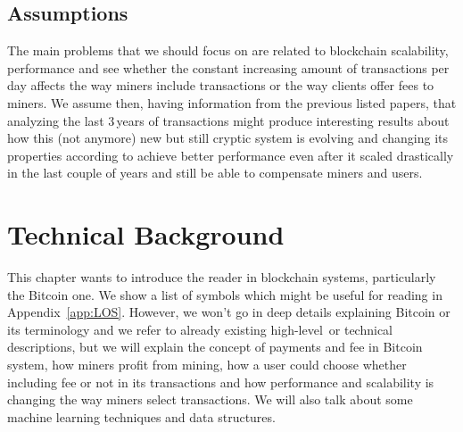 \documentclass[USenglish]{uit-thesis}
\begin{document}
\section{Assumptions} %
\label{sec:assumptions}
The main problems that we should focus on
are related to blockchain scalability, performance and
see whether the constant increasing amount of transactions
per day affects the way miners include transactions
or the way clients offer fees to miners.
We assume then, having information from the
previous listed papers, that analyzing the last $3$\,years
of transactions might produce interesting
results about how this (not anymore) new but still
cryptic system is evolving and changing its
properties according to achieve better performance
even after it scaled drastically in the last couple of
years
and still be able to compensate miners and users.

\chapter{Technical Background}
\label{chap:techback}
This chapter wants to introduce the reader in blockchain systems,
particularly the Bitcoin one. We show a list of symbols which
might be useful for reading in Appendix~\ref{app:LOS}. However,
we won't go in deep details explaining Bitcoin or its
terminology and we refer
to already existing high-level\,\cite{Bohme2015BETG} or
technical\,\cite{ethereum, bitcoinmining,
bitcoin_blockchain, Rizun:2015:blocksizelimit, Nakamoto_bitcoin,
ethereum_white_paper} descriptions, but we will explain the concept
of payments and fee in Bitcoin system, how miners profit from
mining,
how a user could choose whether including fee or not in its
transactions and how performance and scalability is
changing the way miners select transactions.
We will also talk about some machine learning
techniques and data structures.
\end{document}
